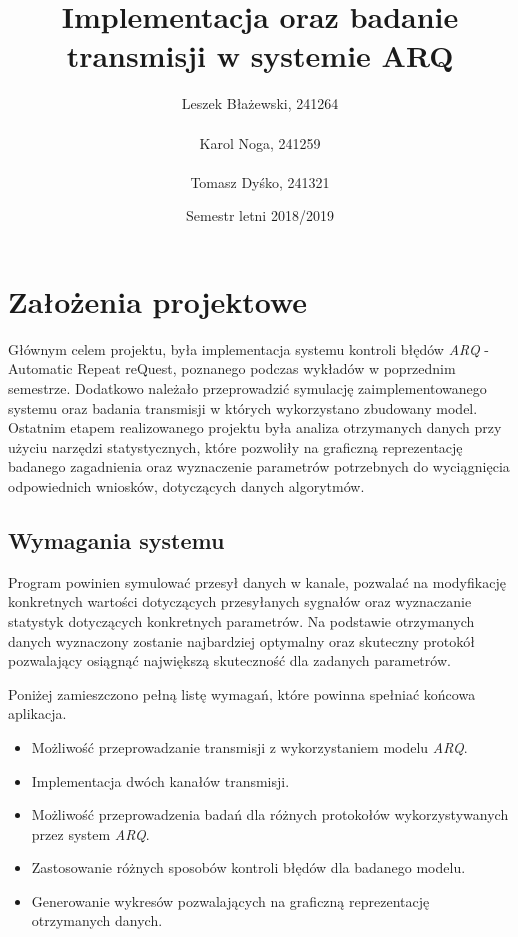 \documentclass{article}
\title{Implementacja oraz badanie transmisji w systemie ARQ}
\author{Leszek Błażewski, 241264 \\ \\Karol Noga, 241259 \\ \\Tomasz Dyśko, 241321}
\date{Semestr letni 2018/2019}
\begin{document}
\maketitle
\thispagestyle{empty}
\clearpage
\setcounter{page}{1}
\tableofcontents
\newpage{}

\section{Założenia projektowe}

Głównym celem projektu, była implementacja systemu kontroli błędów \textit{ARQ} - Automatic Repeat reQuest, poznanego podczas wykładów w poprzednim semestrze. Dodatkowo należało przeprowadzić symulację zaimplementowanego systemu oraz badania transmisji w których wykorzystano zbudowany model. Ostatnim etapem realizowanego projektu była analiza otrzymanych danych przy użyciu narzędzi statystycznych, które pozwoliły na graficzną reprezentację badanego zagadnienia oraz wyznaczenie parametrów potrzebnych do wyciągnięcia odpowiednich wniosków, dotyczących danych algorytmów.

\subsection{Wymagania systemu} \label{Wymagania}

Program powinien symulować przesył danych w kanale, pozwalać na modyfikację konkretnych wartości dotyczących przesyłanych sygnałów oraz wyznaczanie statystyk dotyczących konkretnych parametrów. Na podstawie otrzymanych danych wyznaczony zostanie najbardziej optymalny oraz skuteczny protokół pozwalający osiągnąć największą skuteczność dla zadanych parametrów.

Poniżej zamieszczono pełną listę wymagań, które powinna spełniać końcowa aplikacja.

\begin{itemize}
    \item Możliwość przeprowadzanie transmisji z wykorzystaniem modelu \textit{ARQ}.
    \item Implementacja dwóch kanałów transmisji.
    \item Możliwość przeprowadzenia badań dla różnych protokołów wykorzystywanych przez system \textit{ARQ}.
    \item Zastosowanie różnych sposobów kontroli błędów dla badanego modelu.
    \item Generowanie wykresów pozwalających na graficzną reprezentację otrzymanych danych.
\end{itemize}
\end{document}
